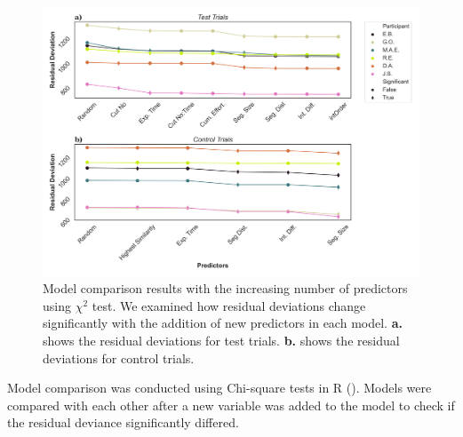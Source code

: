 \documentclass{article}
\begin{document}
\begin{figure}[!ht]
    \centering
    \includegraphics[width=\textwidth]{plots/anova_combined.png}
    \caption{Model comparison results with the increasing number of predictors using $\chi^2$ test. We examined how residual deviations change significantly with the addition of new predictors in each model. \textbf{a.} shows the residual deviations for test trials. \textbf{b.} shows the residual deviations for control trials.}
    \label{fig:anova_cumulative}
\end{figure}


Model comparison was conducted using Chi-square tests in R (\cite{R}). Models were compared with each other after a new variable was added to the model to check if the residual deviance significantly differed. 
\end{document}
